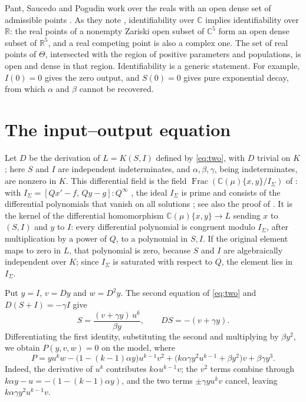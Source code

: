 \documentclass[10pt,a4paper]{article}
\theoremstyle{definition}
\theoremstyle{remark}
\newcommand{\C}{\mathbb C}
\begin{document}
Pant, Saucedo and Pogudin work over the reals with an open dense set of
admissible points \cite[Definition~1]{PSP}. As they note
\cite[Remark~4]{PSP}, identifiability over $\C$ implies identifiability
over $\mathbb R$: the real points of a nonempty Zariski open subset of
$\C^5$ form an open dense subset of $\mathbb R^5$, and a real competing
point is also a complex one. The set of real points of $\Theta$,
intersected with the region of positive parameters and populations, is
open and dense in that region.
Identifiability is a generic statement. For example, $I(0)=0$ gives the
zero output, and $S(0)=0$ gives pure exponential decay, from which
$\alpha$ and $\beta$ cannot be recovered.

\section{The input--output equation}
\label{sec:io}
Let $D$ be the derivation of $L=K(S,I)$ defined by \eqref{eq:two}, with
$D$ trivial on $K$; here $S$ and $I$ are independent indeterminates, and
$\alpha,\beta,\gamma$, being indeterminates, are nonzero in $K$.
This differential field is the field
$\operatorname{Frac}(\C(\mu)\{x,y\}/I_\Sigma)$ of \cite{OPT}: with
$I_\Sigma=[Qx'-f,\,Qy-g]:Q^\infty$ \cite[Notation~2.4]{OPT}, the ideal
$I_\Sigma$ is prime and consists of the differential polynomials that
vanish on all solutions \cite[Lemma~3.2]{HOPY}; see also the proof of
\cite[Corollary~5.7]{OPT}. It is the kernel of the differential
homomorphism $\C(\mu)\{x,y\}\to L$ sending $x$ to $(S,I)$ and $y$ to
$I$: every differential polynomial is congruent modulo $I_\Sigma$,
after multiplication by a power of $Q$, to a polynomial in $S,I$. If the
original element maps to zero in $L$, that polynomial is zero, because
$S$ and $I$ are algebraically independent over $K$; since $I_\Sigma$ is
saturated with respect to $Q$, the element lies in $I_\Sigma$.

Put $y=I$, $v=Dy$ and $w=D^2y$. The second equation of \eqref{eq:two}
and $D(S+I)=-\gamma I$ give
\begin{equation}
 S=\frac{(v+\gamma y)\,u^k}{\beta y},\qquad DS=-(v+\gamma y).
 \label{eq:S}
\end{equation}
Differentiating the first identity, substituting the second and
multiplying by $\beta y^2$, we obtain $P(y,v,w)=0$ on the model, where
\begin{equation}
 P=y u^k w-\bigl(1-(k-1)\alpha y\bigr)u^{k-1}v^2
 +\bigl(k\alpha\gamma y^2u^{k-1}+\beta y^2\bigr)v
 +\beta\gamma y^3 .
 \label{eq:P}
\end{equation}
Indeed, the derivative of $u^k$ contributes $k\alpha u^{k-1}v$; the
$v^2$ terms combine through $k\alpha y-u=-(1-(k-1)\alpha y)$, and the two
terms $\pm\gamma yu^kv$ cancel, leaving $k\alpha\gamma y^2u^{k-1}v$.
\end{document}
